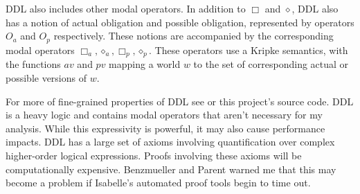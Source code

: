 \begin{isabellebody}
\begin{isamarkuptext}
DDL also includes other modal operators. In addition to $\Box$ and $\diamond$, DDL also has a notion
of actual obligation and possible obligation, represented by operators $O_a$ and $O_p$ respectively. 
These notions are accompanied by the corresponding modal operators $\Box_a, \diamond_a, \Box_p, \diamond_p$. 
These operators use a Kripke semantics, with the functions $av$ and $pv$ mapping a world $w$ to the set 
of corresponding actual or possible versions of $w$. 

For more of fine-grained properties of DDL see \cite{CJDDL} or this project's source code. DDL is a heavy logic and contains modal operators 
that aren't necessary for my analysis. While this expressivity is powerful, it may also cause performance
impacts. DDL has a large set of axioms involving quantification over complex higher-order
logical expressions. Proofs involving these axioms will be computationally expensive.  Benzmueller 
and Parent warned me that this may become a problem if Isabelle's automated proof tools begin to time out.%
\end{isamarkuptext}\isamarkuptrue%
%
\isadelimtheory
%
\endisadelimtheory
%
\isatagtheory
%
\endisatagtheory
{\isafoldtheory}%
%
\isadelimtheory
%
\endisadelimtheory
%
\end{isabellebody}%
\endinput
